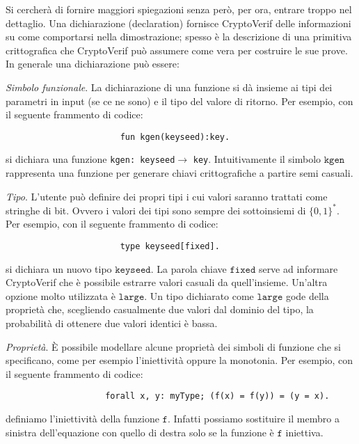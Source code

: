 \documentclass[a4paper,openright,twoside,12pt]{report}
\begin{document}
Si cercher\`a di fornire maggiori spiegazioni senza per\`o, per ora, entrare troppo nel dettaglio.
Una dichiarazione (declaration) fornisce CryptoVerif delle informazioni su come comportarsi nella dimostrazione; 
spesso \`e la descrizione di una primitiva crittografica che CryptoVerif pu\`o assumere come vera per costruire le sue prove.
In generale una dichiarazione pu\`o essere:
\begin{description}
 \item{\emph{Simbolo funzionale}.} La dichiarazione di una funzione si d\`a insieme ai tipi dei parametri in input (se ce ne sono) e il tipo del valore di ritorno. Per esempio, con il seguente frammento di codice:\\
				      \begin{verbatim}
				       fun kgen(keyseed):key.
				      \end{verbatim}	   
si dichiara una funzione \verb!kgen: keyseed!$\rightarrow$ \verb!key!. Intuitivamente il simbolo $\texttt{kgen}$ rappresenta una funzione per generare chiavi crittografiche a partire semi casuali.
 \item{\emph{Tipo}.} L'utente pu\`o definire dei propri tipi i cui valori saranno trattati come stringhe di bit.
	    Ovvero i valori dei tipi sono sempre dei sottoinsiemi di $\{0, 1\}^*$. Per esempio, con il seguente frammento di codice:
  				      \begin{verbatim}
				       type keyseed[fixed].
				      \end{verbatim}
si dichiara un nuovo tipo $\texttt{keyseed}$. La parola chiave $\texttt{fixed}$ serve ad informare CryptoVerif che \`e possibile estrarre valori casuali da quell'insieme.
Un'altra opzione molto utilizzata \`e $\texttt{large}$. Un tipo dichiarato come $\texttt{large}$ gode della propriet\`a che, scegliendo casualmente due valori dal dominio del tipo, la probabilit\`a di ottenere
due valori identici \`e bassa.
 \item{\emph{Propriet\`a}.} \`E possibile modellare alcune propriet\`a dei simboli di funzione che si specificano, come per esempio l'iniettivit\`a oppure la monotonia. Per esempio, con il seguente frammento di codice:
    				      \begin{verbatim}
				    forall x, y: myType; (f(x) = f(y)) = (y = x).
				      \end{verbatim}
definiamo l'iniettivit\`a della funzione $\texttt{f}$. Infatti possiamo sostituire il membro a sinistra dell'equazione con quello di destra solo se la funzione \`e $\texttt{f}$ iniettiva.

\end{description}
\end{document}
